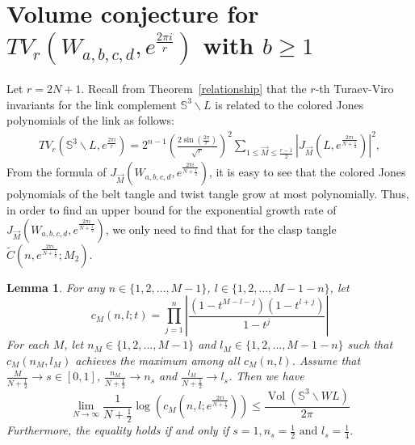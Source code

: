 \documentclass[10pt,a4paper]{article}
\newcommand{\lt}{\left}
\newcommand{\rt}{\right}
\def\Vol{\operatorname{Vol}}
\newtheorem{lemma}{Lemma}
\def\SS{{\mathbb S}}
\def\Vol{\operatorname{Vol}}
\begin{document}
\section{Volume conjecture for $TV_r(W_{a,b,c,d}, e^{\frac{2\pi i}{r}})$ with $b\geq 1$}\label{TV}
Let $r=2N+1$. Recall from Theorem~\ref{relationship} that the $r$-th Turaev-Viro invariants for the link complement $\SS^3 \backslash L$ is related to the colored Jones polynomials of the link as follows:
\begin{align*}
TV_{r}\left(\SS^3 \backslash L, e^{\frac{2\pi i}{r}}\right) = 2^{n-1}\lt( \frac{2\sin(\frac{2\pi}{r})}{\sqrt{r}}\rt)^{2} \sum_{1\leq \vec{M} \leq \frac{r-1}{2}}\left|{J}_{\vec{M}}\left(L,e^{\frac{2\pi i }{N+\frac{1}{2}}}\right)\right|^2 ,
\end{align*}
From the formula of $J_{\vec{M}}(W_{a,b,c,d},e^{\frac{2\pi i}{N+\frac{1}{2}}})$, it is easy to see that the colored Jones polynomials of the belt tangle and twist tangle grow at most polynomially. Thus, in order to find an upper bound for the exponential growth rate of $J_{\vec{M}}(W_{a,b,c,d},e^{\frac{2\pi i}{N+\frac{1}{2}}})$, we only need to find that for the clasp tangle $\tilde{C}(n,e^{\frac{2\pi i}{N+\frac{1}{2}}}; M_2)$. 
 
\begin{lemma}\label{uppbdW}
For any $n \in \{1,2,\dots,M-1\}$, $l \in \{1,2,\dots, M-1-n\}$, let 
$$ c_{M}(n,l;t) = \prod_{j=1}^{n} \lt|\frac{(1-t^{M-l-j})(1-t^{l+j})}{1-t^j}\rt| $$
For each $M$, let $n_M\in \{1,2,\dots,M-1\}$ and $l_M \in \{1,2,\dots, M-1-n\}$ such that $c_M(n_M,l_M)$ achieves the maximum among all $c_{M}(n,l)$. Assume that $\frac{M}{N+\frac{1}{2}} \to s \in [0,1]$, $\frac{n_M}{N+\frac{1}{2}} \to n_s$ and $\frac{l_M}{N+\frac{1}{2}} \to l_s$. Then we have
$$ \lim_{N \to \infty} \frac{1}{N+\frac{1}{2}} \log(c_M(n,l;e^{\frac{2\pi i}{N+\frac{1}{2}}})) \leq \frac{\Vol(\SS^3\backslash WL)}{2\pi} $$
Furthermore, the equality holds if and only if 
$ s=1, n_s = \frac{1}{2} \text{ and } l_s = \frac{1}{4}$.
\end{lemma}
\end{document}
